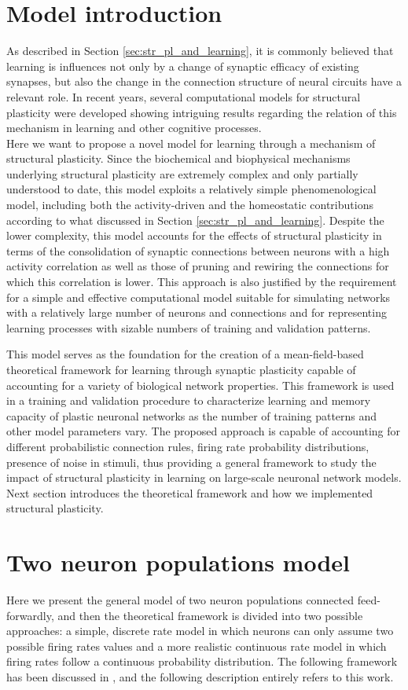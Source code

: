 \documentclass[a4paper, 12pt, twoside, openright]{book}
\begin{document}
\section{Model introduction}
As described in Section \ref{sec:str_pl_and_learning}, it is commonly believed that learning is influences not only by a change of synaptic efficacy of existing synapses, but also the change in the connection structure of neural circuits have a relevant role. In recent years, several computational models for structural plasticity were developed showing intriguing results regarding the relation of this mechanism in learning and other cognitive processes.\\
Here we want to propose a novel model for learning through a mechanism of structural plasticity. 
Since the biochemical and biophysical mechanisms underlying structural plasticity are extremely complex and only partially understood to date, this model exploits a relatively simple phenomenological model, including both the activity-driven and the homeostatic contributions according to what discussed in Section \ref{sec:str_pl_and_learning}. 
Despite the lower complexity, this model accounts for the effects of structural plasticity in terms of the consolidation of synaptic connections between neurons with a high activity correlation as well as those of pruning and rewiring the connections for which this correlation is lower. This approach is also justified by the requirement for a simple and effective computational model suitable for simulating networks with a relatively large number of neurons and connections and for representing learning processes with sizable numbers of training and validation patterns.


This model serves as the foundation for the creation of a mean-field-based theoretical framework for learning through synaptic plasticity capable of accounting for a variety of biological network properties. This framework is used in a training and validation procedure to characterize learning and memory capacity of plastic neuronal networks as the number of training patterns and other model parameters vary.
The proposed approach is capable of accounting for different probabilistic connection rules, firing rate probability distributions, presence of noise in stimuli, thus providing a general framework to study the impact of structural plasticity in learning on large-scale neuronal network models. Next section introduces the theoretical framework and how we implemented structural plasticity.

\section{Two neuron populations model}
Here we present the general model of two neuron populations connected feed-forwardly, and then the theoretical framework is divided into two possible approaches: a simple, discrete rate model in which neurons can only assume two possible firing rates values and a more realistic continuous rate model in which firing rates follow a continuous probability distribution. The following framework has been discussed in \cite{Tiddia2023}, and the following description entirely refers to this work.
\end{document}
